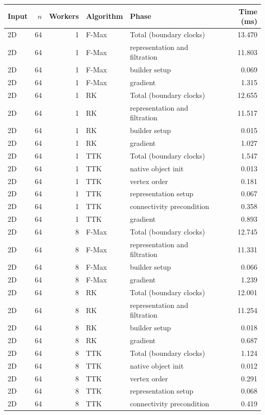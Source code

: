 \begin{tabular}{lrrllr}
\hline
Input & $n$ & Workers & Algorithm & Phase & Time (ms) \\
\hline
2D & 64 & 1 & F-Max & Total (boundary clocks) & 13.470 \\
2D & 64 & 1 & F-Max & representation and filtration & 11.803 \\
2D & 64 & 1 & F-Max & builder setup & 0.069 \\
2D & 64 & 1 & F-Max & gradient & 1.315 \\
2D & 64 & 1 & RK & Total (boundary clocks) & 12.655 \\
2D & 64 & 1 & RK & representation and filtration & 11.517 \\
2D & 64 & 1 & RK & builder setup & 0.015 \\
2D & 64 & 1 & RK & gradient & 1.027 \\
2D & 64 & 1 & TTK & Total (boundary clocks) & 1.547 \\
2D & 64 & 1 & TTK & native object init & 0.013 \\
2D & 64 & 1 & TTK & vertex order & 0.181 \\
2D & 64 & 1 & TTK & representation setup & 0.067 \\
2D & 64 & 1 & TTK & connectivity precondition & 0.358 \\
2D & 64 & 1 & TTK & gradient & 0.893 \\
2D & 64 & 8 & F-Max & Total (boundary clocks) & 12.745 \\
2D & 64 & 8 & F-Max & representation and filtration & 11.331 \\
2D & 64 & 8 & F-Max & builder setup & 0.066 \\
2D & 64 & 8 & F-Max & gradient & 1.239 \\
2D & 64 & 8 & RK & Total (boundary clocks) & 12.001 \\
2D & 64 & 8 & RK & representation and filtration & 11.254 \\
2D & 64 & 8 & RK & builder setup & 0.018 \\
2D & 64 & 8 & RK & gradient & 0.687 \\
2D & 64 & 8 & TTK & Total (boundary clocks) & 1.124 \\
2D & 64 & 8 & TTK & native object init & 0.012 \\
2D & 64 & 8 & TTK & vertex order & 0.291 \\
2D & 64 & 8 & TTK & representation setup & 0.068 \\
2D & 64 & 8 & TTK & connectivity precondition & 0.419 \\

\end{tabular}
